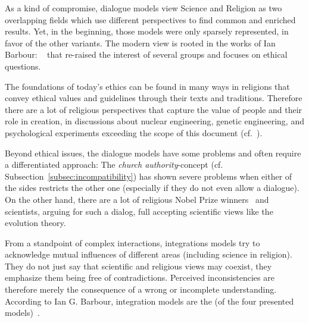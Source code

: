 
As a kind of compromise, dialogue models view Science and Religion as two overlapping fields which use different perspectives to find common and enriched results.
Yet, in the beginning, those models were only sparsely represented, in favor of the other variants.
The modern view is rooted in the works of Ian Barbour: ~\cite{barbour1976myths} that re-raised the interest of several groups and focuses on ethical questions.

The foundations of today's ethics can be found in many ways in religions that convey ethical values and guidelines through their texts and traditions.
Therefore there are a lot of religious perspectives that capture the value of people and their role in creation, in discussions about nuclear engineering, genetic engineering, and psychological experiments exceeding the scope of this document (cf.~\cite{barbour1993ethics,reiss2001improving}).

Beyond ethical issues, the dialogue models have some problems and often require a differentiated approach:
The \emph{church authority}-concept (cf. Subsection~\ref{subsec:incompatibility}) has shown severe problems when either of the sides restricts the other one (especially if they do not even allow a dialogue).
On the other hand, there are a lot of religious Nobel Prize winners~\cite{shalev2002100} and scientists, arguing for such a dialog, full accepting scientific views like the evolution theory.



From a standpoint of complex interactions, integrations models try to acknowledge mutual influences of different areas (including science in religion).
They do not just say that scientific and religious views may coexist, they emphasize them being free of contradictions.
Perceived inconsistencies are therefore merely the consequence of a wrong or incomplete understanding.
According to Ian G. Barbour, integration models are the  (of the four presented models)~\cite[p.~2]{Barbour2002}.




